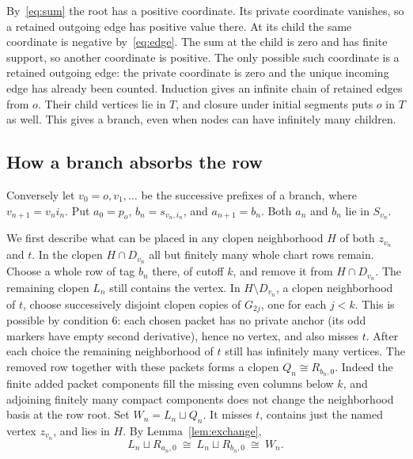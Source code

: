 \documentclass[11pt,letterpaper]{article}
\theoremstyle{definition}\newtheorem{definition}[theorem]{Definition}
\begin{document}
By~\eqref{eq:sum} the root has a positive coordinate. Its private
coordinate vanishes, so a retained outgoing edge has positive value there.
At its child the same coordinate is negative by~\eqref{eq:edge}. The
sum at the child is zero and has finite support, so another coordinate
is positive. The only possible such coordinate is a retained outgoing
edge: the private coordinate is zero and the unique incoming edge has
already been counted. Induction gives an infinite chain of retained edges
from \(o\). Their child vertices lie in \(T\), and closure under initial
segments puts \(o\) in \(T\) as well. This gives a branch, even when nodes
can have infinitely many children.

\subsection{How a branch absorbs the row}
Conversely let \(v_0=o,v_1,\ldots\) be the successive prefixes of a branch,
where \(v_{n+1}=v_ni_n\). Put \(a_0=p_o\), \(b_n=s_{v_n,i_n}\),
and \(a_{n+1}=b_n\). Both \(a_n\) and \(b_n\) lie in \(S_{v_n}\).

We first describe what can be placed in any clopen neighborhood \(H\) of
both \(z_{v_n}\) and \(t\). In the clopen \(H\cap D_{v_n}\) all but
finitely many whole chart rows remain. Choose a whole row of tag \(b_n\)
there, of cutoff \(k\), and remove it from \(H\cap D_{v_n}\). The
remaining clopen \(L_n\) still contains the vertex. In \(H\setminus
D_{v_n}\), a clopen neighborhood of \(t\), choose successively disjoint
clopen copies of \(G_{2j}\), one for each \(j<k\). This is possible by
condition 6: each chosen packet has no private anchor (its odd markers have
empty second derivative), hence no vertex, and also misses \(t\). After
each choice the remaining neighborhood of \(t\) still has infinitely many
vertices. The removed row together with these packets forms a clopen
\(Q_n\cong R_{b_n,0}\). Indeed the finite added packet components fill the
missing even columns below \(k\), and adjoining finitely many compact
components does not change the neighborhood basis at the row root.
Set \(W_n=L_n\sqcup Q_n\). It misses \(t\), contains just the named vertex
\(z_{v_n}\), and lies in \(H\). By Lemma~\ref{lem:exchange},
\begin{equation}\label{eq:block}
 L_n\sqcup R_{a_n,0}\ \cong\ L_n\sqcup R_{b_n,0}\ \cong\ W_n.
\end{equation}
\end{document}
